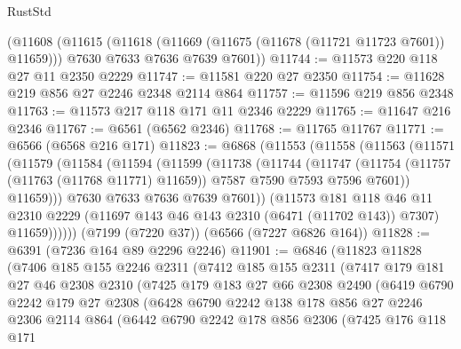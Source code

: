 \begin{lexlean}{RustStd}
\begin{coremodule}
    (@11608
      (@11615
        (@11618 (@11669 (@11675 (@11678 (@11721 @11723 @7601)) @11659)))
        @7630
        @7633
        @7636
        @7639
        @7601))
@11744 := @11573 @220 @118 @27 @11 @2350 @2229
@11747 := @11581 @220 @27 @2350
@11754 := @11628 @219 @856 @27 @2246 @2348 @2114 @864
@11757 := @11596 @219 @856 @2348
@11763 := @11573 @217 @118 @171 @11 @2346 @2229
@11765 := @11647 @216 @2346
@11767 := @6561 (@6562 @2346)
@11768 := @11765 @11767
@11771 := @6566 (@6568 @216 @171)
@11823 := @6868
    (@11553
      (@11558
        (@11563
          (@11571
            (@11579
              (@11584
                (@11594
                  (@11599
                    (@11738
                      (@11744
                        (@11747
                          (@11754
                            (@11757 (@11763 (@11768 @11771) @11659))
                            @7587
                            @7590
                            @7593
                            @7596
                            @7601))
                        @11659)))
                  @7630
                  @7633
                  @7636
                  @7639
                  @7601))
              (@11573
                @181
                @118
                @46
                @11
                @2310
                @2229
                (@11697 @143 @46 @143 @2310 (@6471 (@11702 @143)) @7307)
                @11659))))))
    (@7199 (@7220 @37))
    (@6566 (@7227 @6826 @164))
@11828 := @6391 (@7236 @164 @89 @2296 @2246)
@11901 := @6846
    (@11823
      @11828
      (@7406
        @185
        @155
        @2246
        @2311
        (@7412
          @185
          @155
          @2311
          (@7417
            @179
            @181
            @27
            @46
            @2308
            @2310
            (@7425
              @179
              @183
              @27
              @66
              @2308
              @2490
              (@6419
                @6790
                @2242
                @179
                @27
                @2308
                (@6428
                  @6790
                  @2242
                  @138
                  @178
                  @856
                  @27
                  @2246
                  @2306
                  @2114
                  @864
                  (@6442
                    @6790
                    @2242
                    @178
                    @856
                    @2306
                    (@7425
                      @176
                      @118
                      @171

\end{coremodule}
\end{lexlean}
